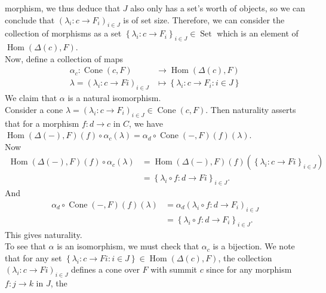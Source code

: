\documentclass[a4paper]{article}
\DeclareMathOperator{\Hom}{Hom}
\DeclareMathOperator{\Set}{Set}
\DeclareMathOperator{\Cone}{Cone}
\begin{document}
    morphism, we thus deduce that $J$ also only has a set's worth of objects,
    so we can conclude that
    $\left( \lambda_i  \colon c \to F_i \right)_{i \in J}$ is of set size.
    Therefore,
    we can consider the collection of morphisms as a set
    $\left\{ \lambda_i  \colon c \to F_i \right\}_{i \in J}
    \in \Set$ which is
    an element of $\Hom\left( \Delta(c), F \right) $.\\
    Now, define a collection of maps
    \begin{align*}
        \alpha_c  \colon \Cone(c,F) &\to \Hom (\Delta(c),F)\\
        \lambda = \left( \lambda_i  \colon c \to Fi \right)_{i \in J} 
        &\mapsto \left\{ \lambda_i  \colon c \to F_i  \colon i\in J \right\} 
    \end{align*}
    We claim that $\alpha$ is a natural isomorphism.\\
    \linebreak
    Consider a cone $\lambda = \left( \lambda_i  \colon c \to F_i \right)_{i
    \in J} \in \Cone(c,F)$. Then naturality asserts that for a morphism
    $f  \colon d \to c$ in $C$, we have
    $\Hom\left( \Delta(-), F \right)(f) \circ \alpha_c \left( \lambda \right) 
    = \alpha_d \circ \Cone(-,F)(f) (\lambda)$.\\
    Now
    \begin{align*}
        \Hom\left( \Delta(-), F \right) (f) \circ \alpha_c (\lambda)
        &= \Hom\left( \Delta(-),F \right)(f) \left( \left\{ \lambda_i  \colon c \to
        F i \right\}_{i \in J} \right) \\
        &= \left\{\lambda_i \circ f  \colon d \to Fi  \right\}_{i \in J}.
    \end{align*}
    And
    \begin{align*}
        \alpha_d \circ \Cone(-,F)(f)(\lambda)
        &= \alpha_d \left( \lambda_i \circ f  \colon d \to F_i \right)_{i \in
        J}\\
        &= \left\{ \lambda_i \circ f  \colon d \to F_i \right\}_{i \in J}.
    \end{align*}
    This gives naturality.\\
    \linebreak
    To see that $\alpha$ is an isomorphism, we must check that $\alpha_c$ is
    a bijection. We note that
    for any set $\left\{ \lambda_i  \colon c \to Fi  \colon
    i \in J\right\} \in \Hom\left( \Delta(c),F \right) $, the collection
    $\left( \lambda_i  \colon c \to Fi \right)_{i \in J}$ defines
    a cone over $F$ with summit $c$ since for any morphism $f  \colon j\to k$ in $J$, the
\end{document}
